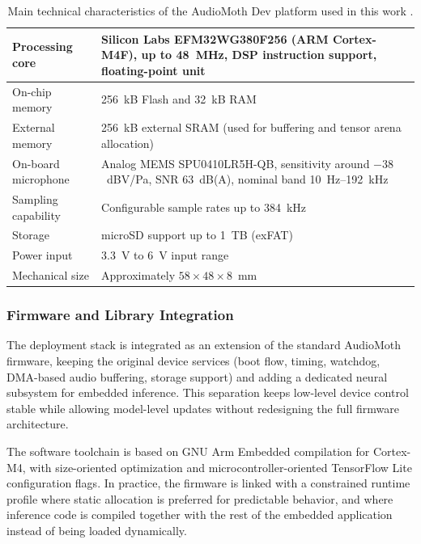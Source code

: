 \documentclass[a4paper,singleside,12pt]{report} %
\begin{document}
	\begin{table}[H]
		\centering
		\scriptsize
		\renewcommand{\arraystretch}{1.15}
		\setlength{\tabcolsep}{6pt}
		\caption{Main technical characteristics of the AudioMoth Dev platform used in this work \cite{audiomothdev2023}.}
		\label{tab:audiomoth_specs}
		\begin{tabular}{|l|p{9.0cm}|}
			\hline
			Processing core & Silicon Labs EFM32WG380F256 (ARM Cortex-M4F), up to 48~MHz, DSP instruction support, floating-point unit \\
			\hline
			On-chip memory & 256~kB Flash and 32~kB RAM \\
			\hline
			External memory & 256~kB external SRAM (used for buffering and tensor arena allocation) \\
			\hline
			On-board microphone & Analog MEMS SPU0410LR5H-QB, sensitivity around \(-38\)~dBV/Pa, SNR \(63\)~dB(A), nominal band 10~Hz--192~kHz \\
			\hline
			Sampling capability & Configurable sample rates up to 384~kHz \\
			\hline
			Storage & microSD support up to 1~TB (exFAT) \\
			\hline
			Power input & 3.3~V to 6~V input range \\
			\hline
			Mechanical size & Approximately \(58 \times 48 \times 8\)~mm \\
			\hline
		\end{tabular}
	\end{table}

\subsubsection{Firmware and Library Integration}
	The deployment stack is integrated as an extension of the standard AudioMoth firmware, keeping the original device services (boot flow, timing, watchdog, DMA-based audio buffering, storage support) and adding a dedicated neural subsystem for embedded inference. This separation keeps low-level device control stable while allowing model-level updates without redesigning the full firmware architecture.

	The software toolchain is based on GNU Arm Embedded compilation for Cortex-M4, with size-oriented optimization and microcontroller-oriented TensorFlow Lite configuration flags. In practice, the firmware is linked with a constrained runtime profile where static allocation is preferred for predictable behavior, and where inference code is compiled together with the rest of the embedded application instead of being loaded dynamically.
\end{document}
